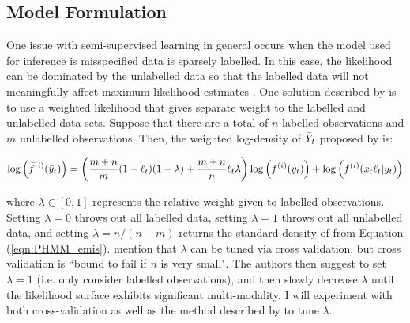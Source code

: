 
\subsection{Model Formulation}

One issue with semi-supervised learning in general occurs when the model used for inference is misspecified data is sparsely labelled. In this case, the likelihood can be dominated by the unlabelled data so that the labelled data will not meaningfully affect maximum likelihood estimates \citep{Chapelle:2006,Ren:2020}. One solution described by \citet{Chapelle:2006} is to use a weighted likelihood that gives separate weight to the labelled and unlabelled data sets. Suppose that there are a total of $n$ labelled observations and $m$ unlabelled observations. Then, the weighted log-density of $\bar{Y}_t$ proposed by \citet{Chapelle:2006} is:

\begin{equation}
    \log\left(\bar{f}^{(i)}(\bar{y}_t)\right) = \left(\frac{m+n}{m}(1-\ell_t)(1-\lambda) + \frac{m+n}{n}\ell_t\lambda\right)  \log\left(f^{(i)}(y_t)\right) + \log \left(f^{(i)}(x_t \ell_t|y_t)\right)
    \label{eqn:w_like}
\end{equation}

where $\lambda \in [0,1]$ represents the relative weight given to labelled observations. Setting $\lambda = 0$ throws out all labelled data, setting $\lambda = 1$ throws out all unlabelled data, and setting $\lambda = n/(n+m)$ returns the standard density of from Equation (\ref{eqn:PHMM_emis}). \citet{Chapelle:2006} mention that $\lambda$ can be tuned via cross validation, but cross validation is ``bound to fail if $n$ is very small". The authors then suggest to set $\lambda = 1$ (i.e. only consider labelled observations), and then slowly decrease $\lambda$ until the likelihood surface exhibits significant multi-modality. I will experiment with both cross-validation as well as the method described by \citet{Chapelle:2006} to tune $\lambda$.

